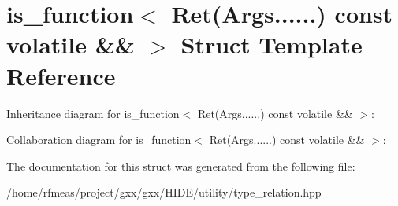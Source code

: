 \hypertarget{structis__function_3_01Ret_07Args_8_8_8_8_8_8_08_01const_01volatile_01_6_6_01_4}{}\section{is\+\_\+function$<$ Ret(Args......) const volatile \&\& $>$ Struct Template Reference}
\label{structis__function_3_01Ret_07Args_8_8_8_8_8_8_08_01const_01volatile_01_6_6_01_4}


Inheritance diagram for is\+\_\+function$<$ Ret(Args......) const volatile \&\& $>$\+:


Collaboration diagram for is\+\_\+function$<$ Ret(Args......) const volatile \&\& $>$\+:


The documentation for this struct was generated from the following file\+:\begin{DoxyCompactItemize}
\item 
/home/rfmeas/project/gxx/gxx/\+H\+I\+D\+E/utility/type\+\_\+relation.\+hpp\end{DoxyCompactItemize}
